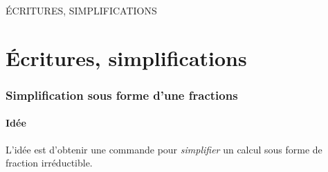 \documentclass[a4paper,french,11pt]{article}
\begin{document}
\begin{PresCodePL}{}
\end{PresCodePL}

\begin{PresCodePL}{}
\end{PresCodePL}

\pagebreak

\begin{PresCodePL}{}
\end{PresCodePL}

\pagebreak

\begin{PresCodePL}{}
\end{PresCodePL}

\pagebreak

\begin{PresCodePL}{}
\end{PresCodePL}

\newpage

\phantom{t}\par\vfill\par
\begin{PART}
	\begin{center}
		\Huge\MakeUppercase{Écritures, simplifications}
	\end{center}
\end{PART}
\par\vfill\par\phantom{t}

\newpage

\part{Écritures, simplifications}

\section{Simplification sous forme d'une fractions}\label{convfrac}

\subsection{Idée}

\begin{tipblock}
L'idée est d'obtenir une commande pour \textit{simplifier} un calcul sous forme de fraction irréductible.
\end{tipblock}
\end{document}
